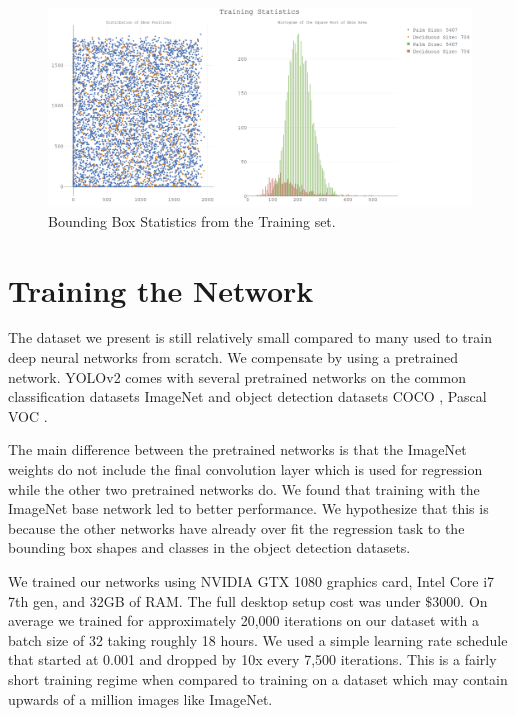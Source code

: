 \begin{figure}[ht]
\includegraphics[width=1.0\textwidth]{Figures/TrainingStats.png}
\caption{Bounding Box Statistics from the Training set.}
\label{fig:TrainingStats}
\end{figure}

\section{Training the Network}

The dataset we present is still relatively small compared to many used to train deep neural networks from scratch. We compensate by using a pretrained network. YOLOv2 comes with several pretrained networks on the common classification datasets ImageNet and object detection datasets COCO \cite{COCO}, Pascal VOC \cite{VOC}.

The main difference between the pretrained networks is that the ImageNet weights do not include the final convolution layer which is used for regression while the other two pretrained networks do. We found that training with the ImageNet base network led to better performance. We hypothesize that this is because the other networks have already over fit the regression task to the bounding box shapes and classes in the object detection datasets.

We trained our networks using NVIDIA GTX 1080 graphics card, Intel Core i7 7th gen, and 32GB of RAM. The full desktop setup cost was under $\$3000$. On average we trained for approximately 20,000 iterations on our dataset with a batch size of 32 taking roughly 18 hours. We used a simple learning rate schedule that started at 0.001 and dropped by 10x every 7,500 iterations. This is a fairly short training regime when compared to training on a dataset which may contain upwards of a million images like ImageNet.

